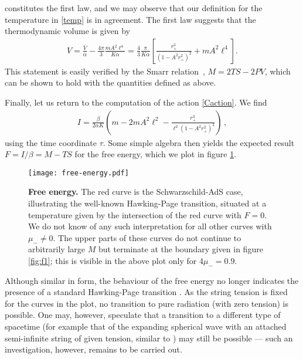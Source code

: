 \documentclass[
twoside,
openright,
frontopenright,
]{dmathesis}
\begin{document}
 constitutes the first law, and we may observe that our
definition for the temperature in \cref{temp} is in agreement. The first law
suggests that the thermodynamic volume is given by
\begin{align}\label{vol}
  V = \frac{\bar{V}}{\alpha} - \frac{4\pi}{3} \frac{mA^2\ell^4}{K\alpha} =
  \frac{4}{3}\frac{\pi}{K \alpha}\left[\frac{r_+^3}{(1-A^2r_+^2)^2} 
  +mA^2\ell^4\right].
\end{align}
This statement is easily verified by the Smarr relation~\cite{Smarr:1972kt},
$M = 2 TS - 2PV$, which can be shown to hold with the quantities defined as
above.

Finally, let us return to the computation of the action \eqref{Caction}.
We find
\begin{align}
I = \frac{\beta}{2\alpha K} \left( m - 2mA^2\ell^2
- \frac{r_+^3}{\ell^2(1-A^2r_+^2)^2} \right)\,,
\label{Caction}
\end{align}
using the time coordinate $\tau$. Some simple algebra then yields the
expected result $F=I/\beta=M-TS$
for the free energy, which we plot in figure \ref{fig:FE}.
\begin{figure}[tbp]
\centering
\texttt{[image: free-energy.pdf]}
\caption{\textbf{Free energy.}  The red curve is the Schwarzschild-AdS case,
  illustrating the well-known Hawking-Page transition, situated at a temperature
  given by the intersection of the red curve with $F=0$. We do not know of any
  such interpretation for all other curves with $\mu_-\neq 0$.  The upper parts
  of these curves do not continue to arbitrarily large $M$ but terminate at the
  boundary given in figure \ref{fig:f1}; this is visible in the above plot only
  for $4\mu_- =0.9$.  }
\label{fig:FE}
\end{figure}

Although similar in form, the behaviour of the free energy no longer indicates
the presence of a standard Hawking-Page transition \cite{Hawking:1982dh}.
As the string tension is fixed for the curves in the plot, no transition to
pure radiation (with zero tension) is possible. One may, however, speculate that
a transition to a different type of spacetime (for example {that of the expanding spherical wave with an attached semi-infinite string of given tension, similar to} \cite{Podolsky:2004bk})
may still be possible --- such an investigation, however, remains to be carried out.
\end{document}
